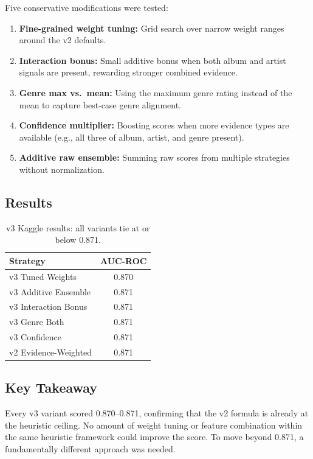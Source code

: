 \documentclass[12pt]{article}
\begin{document}
Five conservative modifications were tested:

\begin{enumerate}
	\item \textbf{Fine-grained weight tuning:} Grid search over narrow weight ranges around the v2 defaults.
	\item \textbf{Interaction bonus:} Small additive bonus when both album and artist signals are present, rewarding stronger combined evidence.
	\item \textbf{Genre max vs.\ mean:} Using the maximum genre rating instead of the mean to capture best-case genre alignment.
	\item \textbf{Confidence multiplier:} Boosting scores when more evidence types are available (e.g., all three of album, artist, and genre present).
	\item \textbf{Additive raw ensemble:} Summing raw scores from multiple strategies without normalization.
\end{enumerate}

\subsection{Results}

\begin{table}[H]
	\centering
	\begin{tabular}{lc}
		\toprule
		\textbf{Strategy} & \textbf{AUC-ROC} \\
		\midrule
		v3 Tuned Weights      & 0.870 \\
		v3 Additive Ensemble  & 0.871 \\
		v3 Interaction Bonus  & 0.871 \\
		v3 Genre Both         & 0.871 \\
		v3 Confidence         & 0.871 \\
		\midrule
		v2 Evidence-Weighted  & 0.871 \\
		\bottomrule
	\end{tabular}
	\caption{v3 Kaggle results: all variants tie at or below 0.871.}\label{tab:v3}
\end{table}

\subsection{Key Takeaway}

Every v3 variant scored 0.870--0.871, confirming that the v2 formula is already at the heuristic ceiling. No amount of weight tuning or feature combination within the same heuristic framework could improve the score. To move beyond 0.871, a fundamentally different approach was needed.
\end{document}
